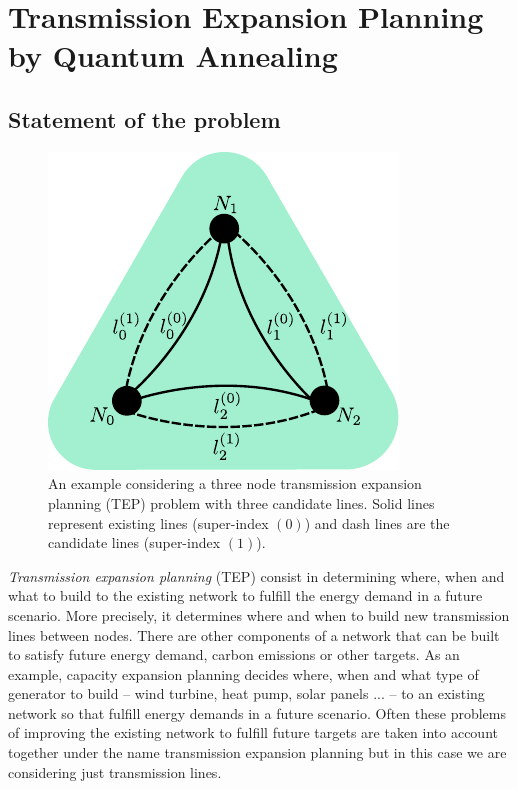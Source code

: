 \chapter{Transmission Expansion Planning by Quantum Annealing} %
\label{Chapter4} %
\section{Statement of the problem}
\begin{figure}
\includegraphics[scale=0.9]{Figures/3Node_Layer 1.pdf} 
\caption{An example considering a three node transmission expansion planning (TEP) problem with three candidate lines. Solid lines represent existing lines (super-index $(0)$) and dash lines are the candidate lines (super-index $(1)$).}
\label{fig:3node}
\end{figure}
\textit{Transmission expansion planning} (TEP) consist in determining where, when and what to build to the existing network to fulfill the energy demand in a future scenario. 
More precisely, it determines where and when to build new transmission lines between nodes. There are other components of a network that can be built to satisfy future energy demand, carbon emissions or other targets. As an example, capacity expansion planning decides where, when and what type of generator to build -- wind turbine, heat pump, solar panels ... -- to an existing network so that fulfill energy demands in a future scenario. Often these problems of improving the existing network to fulfill future targets are taken into account together under the name transmission expansion planning but in this case we are considering just transmission lines.\par
